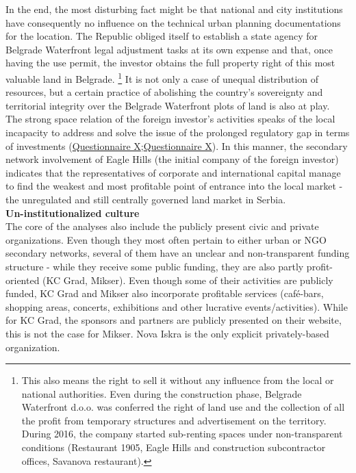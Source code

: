\documentclass[11pt]{report}
\begin{document}
In the end, the most disturbing fact might be that national and city institutions have consequently no influence on the technical urban planning documentations for the location. The Republic obliged itself to establish a state agency for Belgrade Waterfront legal adjustment tasks at its own expense and that, once having the use permit, the investor obtains the full property right of this most valuable land in Belgrade. 
\footnote{This also means the right to sell it without any influence from the local or national authorities. Even during the construction phase, Belgrade Waterfront d.o.o. was conferred the right of land use and the collection of all the profit from temporary structures and advertisement on the territory. During 2016, the company started sub-renting spaces under non-transparent conditions (Restaurant 1905, Eagle Hills and construction subcontractor offices, Savanova restaurant).}
It is not only a case of unequal distribution of resources, but a certain practice of abolishing the country’s sovereignty and territorial integrity over the Belgrade Waterfront plots of land is also at play.
\\

The strong space relation of the foreign investor's activities speaks of the local incapacity to address and solve the issue of the prolonged regulatory gap in terms of investments (\href{Questionnaire Experts Post-socialist}{Questionnaire X};\href{Questionnaire Experts Savamala}{Questionnaire X}).
In this manner, the secondary network involvement of Eagle Hills (the initial company of the foreign investor) indicates that the representatives of corporate and international capital manage to find the weakest and most profitable point of entrance into the local market - the unregulated and still centrally governed land market in Serbia.
\\

\textbf{Un-institutionalized culture}
\\

The core of the analyses also include the publicly present civic and private organizations.  Even though  they most often pertain to either  urban or NGO secondary networks, several of them have an unclear and non-transparent funding structure - while they receive some public funding, they are also partly profit-oriented (KC Grad, Mikser). Even though some of their activities are publicly funded, KC Grad and Mikser also incorporate profitable services (café-bars, shopping areas, concerts, exhibitions and other lucrative events/activities). While for KC Grad, the sponsors and partners are  publicly presented on their website, this is not the case for Mikser. Nova Iskra is the only explicit privately-based organization.
\\
\end{document}
